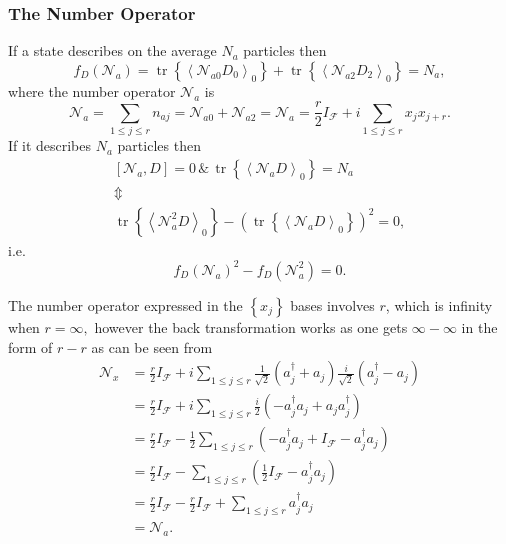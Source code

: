 \documentclass[aps,preprint]{revtex4}%
\begin{document}
\subsubsection{The Number Operator}

If a state describes on the average $N_{a}$ particles then%
\begin{equation}
f_{D}\left(  \mathcal{N}_{a}\right)  =\operatorname*{tr}\left\{  \left\langle
\mathcal{N}_{a0}D_{0}\right\rangle _{0}\right\}  +\operatorname*{tr}\left\{
\left\langle \mathcal{N}_{a2}D_{2}\right\rangle _{0}\right\}  =N_{a},
\end{equation}
where the number operator $\mathcal{N}_{a}$ is
\begin{equation}
\mathcal{N}_{a}=\sum_{1\leq j\leq r}n_{aj}=\mathcal{N}_{a0}+\mathcal{N}%
_{a2}=\mathcal{N}_{a}=\frac{r}{2}I_{\mathcal{F}}+i\sum_{1\leq j\leq r}%
x_{j}x_{j+r}.
\end{equation}
If it describes $N_{a}$ particles then
\begin{gather}
\left[  \mathcal{N}_{a},D\right]  =0\,\&\,\operatorname*{tr}\left\{
\left\langle \mathcal{N}_{a}D\right\rangle _{0}\right\}  =N_{a}\nonumber\\
\Updownarrow\nonumber\\
\operatorname*{tr}\left\{  \left\langle \mathcal{N}_{a}^{2}D\right\rangle
_{0}\right\}  -\left(  \operatorname*{tr}\left\{  \left\langle \mathcal{N}%
_{a}D\right\rangle _{0}\right\}  \right)  ^{2}=0,
\end{gather}
i.e.
\begin{equation}
f_{D}\left(  \mathcal{N}_{a}\right)  ^{2}-f_{D}\left(  \mathcal{N}_{a}%
^{2}\right)  =0.
\end{equation}


The number operator expressed in the $\left\{  x_{j}\right\}  $ bases involves
$r$, which is infinity when $r=\infty,$ however the back transformation works
as one gets $\infty-\infty$ in the form of $r-r$ as can be seen from%
\begin{align}
\mathcal{N}_{x}  &  =\frac{r}{2}I_{\mathcal{F}}+i\sum_{1\leq j\leq r}\frac
{1}{\sqrt{2}}\left(  a_{j}^{\dagger}+a_{j}\right)  \frac{i}{\sqrt{2}}\left(
a_{j}^{\dagger}-a_{j}\right) \nonumber\\
&  =\frac{r}{2}I_{\mathcal{F}}+i\sum_{1\leq j\leq r}\frac{i}{2}\left(
-a_{j}^{\dagger}a_{j}+a_{j}a_{j}^{\dagger}\right) \nonumber\\
&  =\frac{r}{2}I_{\mathcal{F}}-\frac{1}{2}\sum_{1\leq j\leq r}\left(
-a_{j}^{\dagger}a_{j}+I_{\mathcal{F}}-a_{j}^{\dagger}a_{j}\right) \nonumber\\
&  =\frac{r}{2}I_{\mathcal{F}}-\sum_{1\leq j\leq r}\left(  \frac{1}%
{2}I_{\mathcal{F}}-a_{j}^{\dagger}a_{j}\right) \nonumber\\
&  =\frac{r}{2}I_{\mathcal{F}}-\frac{r}{2}I_{\mathcal{F}}+\sum_{1\leq j\leq
r}a_{j}^{\dagger}a_{j}\nonumber\\
&  =\mathcal{N}_{a}.
\end{align}
\end{document}
